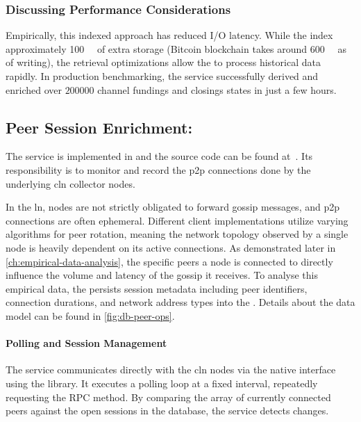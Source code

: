 \subsubsection{Discussing Performance Considerations}
Empirically, this indexed approach has reduced I/O latency. 
While the  index approximately \qty{100}{\giga\byte} of extra storage (Bitcoin blockchain takes around \qty{600}{\giga\byte} as of writing),
the retrieval optimizations allow the  to process historical data rapidly. 
In production benchmarking, the service successfully derived and enriched over $200000$ channel fundings and closings states in just a few hours.



\subsection{Peer Session Enrichment: }
\label{sec:peer-manager}

The  service is implemented in  and the source code can be found at~\cite{kraus_peermanager_2026}. 
Its responsibility is to monitor and record the \gls{p2p} connections done by the underlying \gls{cln} collector nodes.

In the \gls{ln}, nodes are not strictly obligated to forward gossip messages, and \gls{p2p} connections are often ephemeral. 
Different client implementations utilize varying algorithms for peer rotation, 
meaning the network topology observed by a single node is heavily dependent on its active connections. 
As demonstrated later in \autoref{ch:empirical-data-analysis}, 
the specific peers a node is connected to directly influence the volume and latency of the gossip it receives. 
To analyse this empirical data, the  persists session metadata 
including peer identifiers, connection durations, and network address types into the .
Details about the data model can be found in \autoref{fig:db-peer-ops}.

\paragraph{Polling and Session Management}
The service communicates directly with the \gls{cln} nodes via the native  interface using the  library. 
It executes a polling loop at a fixed interval, repeatedly requesting the  RPC method. 
By comparing the array of currently connected peers against the open sessions in the database, the service detects changes. 

